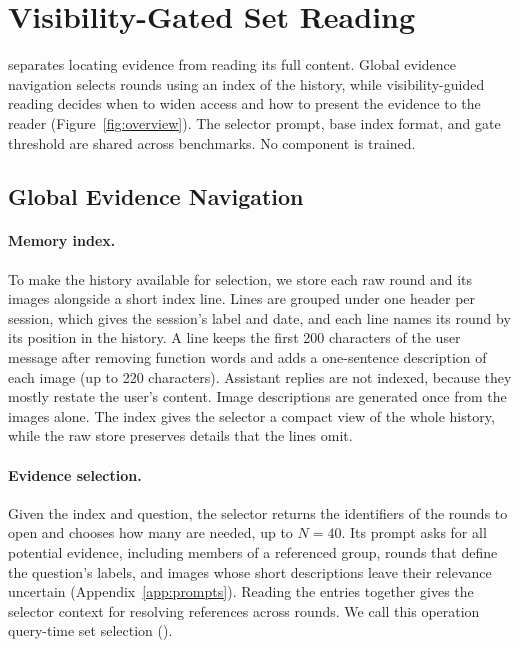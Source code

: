 \section{Visibility-Gated Set Reading}
\label{sec:method}

\vgs{} separates locating evidence from reading its full content. Global evidence navigation selects rounds using an index of the history, while visibility-guided reading decides when to widen access and how to present the evidence to the reader (Figure~\ref{fig:overview}). The selector prompt, base index format, and gate threshold are shared across benchmarks. No component is trained.

\subsection{Global Evidence Navigation}
\label{sec:index}

\paragraph{Memory index.} To make the history available for selection, we store each raw round and its images alongside a short index line. Lines are grouped under one header per session, which gives the session's label and date, and each line names its round by its position in the history. A line keeps the first 200 characters of the user message after removing function words and adds a one-sentence description of each image (up to 220 characters). Assistant replies are not indexed, because they mostly restate the user's content. Image descriptions are generated once from the images alone. The index gives the selector a compact view of the whole history, while the raw store preserves details that the lines omit.

\paragraph{Evidence selection.}
\label{sec:select}
Given the index and question, the selector returns the identifiers of the rounds to open and chooses how many are needed, up to $N{=}40$. Its prompt asks for all potential evidence, including members of a referenced group, rounds that define the question's labels, and images whose short descriptions leave their relevance uncertain (Appendix~\ref{app:prompts}). Reading the entries together gives the selector context for resolving references across rounds. We call this operation query-time set selection (\qss{}).

